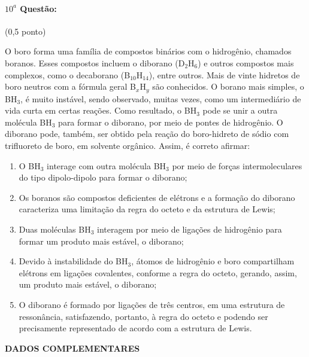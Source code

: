 \documentclass[12pt,a4paper]{article}
\begin{document}
 \paragraph{$10^a$ Questão:} (0,5 ponto)

O boro forma uma família de compostos binários com o hidrogênio, chamados boranos. Esses compostos incluem o diborano (D$_2$H$_6$) e
outros compostos mais complexos, como o decaborano (B$_{10}$H$_{14}$), entre outros. Mais de vinte hidretos de boro neutros com a fórmula geral 
B$_x$H$_y$ são conhecidos. O borano mais simples, o BH$_3$, é muito instável, sendo observado, muitas vezes, como um intermediário de vida curta em certas reações.
Como resultado, o BH$_3$ pode se unir a outra molécula BH$_3$ para formar o diborano, por meio de pontes de hidrogênio. O diborano pode, também, ser obtido pela reação do boro-hidreto de sódio com trifluoreto de boro, em solvente orgânico. Assim, é correto afirmar:
\begin{enumerate}[label=\alph*)]
\item O BH$_3$ interage com outra molécula BH$_3$ por meio de forças intermoleculares do tipo dipolo-dipolo para formar o diborano;
\item Os boranos são compostos deficientes de elétrons e a formação do diborano caracteriza uma limitação da regra do octeto e da estrutura de Lewis;
\item Duas moléculas BH$_3$ interagem por meio de ligações de hidrogênio para formar um produto mais estável, o diborano;
\item Devido à instabilidade do BH$_3$, átomos de hidrogênio e boro compartilham elétrons em ligações covalentes, conforme a regra do octeto, gerando, assim, um produto
mais estável, o diborano;
\item O diborano é formado por ligações de três centros, em uma estrutura de ressonância, satisfazendo, portanto, à regra do octeto e podendo ser precisamente representado
de acordo com a estrutura de Lewis.
\end{enumerate}
 \newpage
 \begin{center}
 \textbf{DADOS COMPLEMENTARES}
 \end{center}
 
\end{document}
